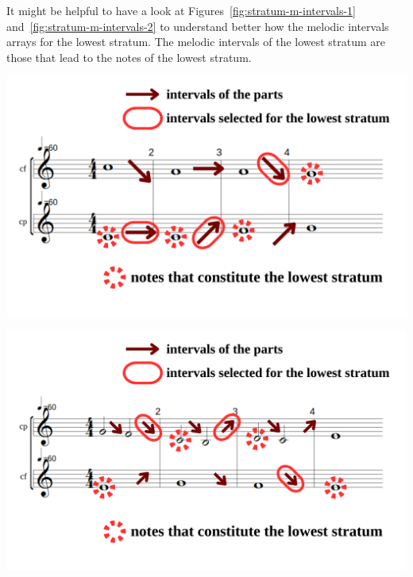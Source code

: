 \noindent It might be helpful to have a look at Figures~\ref{fig:stratum-m-intervals-1} and~\ref{fig:stratum-m-intervals-2} to understand better how the melodic intervals arrays for the lowest stratum. The melodic intervals of the lowest stratum are those that lead to the notes of the lowest stratum.

\vspace{.5cm}
\begin{minipage}{0.46\textwidth}
    \centering
    \includegraphics[width=\textwidth]{Images/stratum-m-intervals.png}
    \label{fig:stratum-m-intervals-1}
    \end{minipage}
    \hfill
    \begin{minipage}{0.46\textwidth}
      \centering
      \includegraphics[width=\textwidth]{Images/stratum-m-intervals2.png}
      \label{fig:stratum-m-intervals-2}
\end{minipage}

